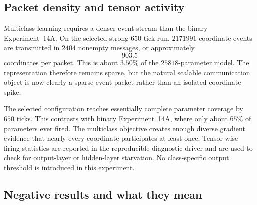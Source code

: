 \subsection{Packet density and tensor activity}

Multiclass learning requires a denser event stream than the binary Experiment~14A. On the selected strong $650$-tick run, $2171991$ coordinate events are transmitted in $2404$ nonempty messages, or approximately
\begin{equation}
903.5
\end{equation}
coordinates per packet. This is about $3.50\%$ of the $25818$-parameter model. The representation therefore remains sparse, but the natural scalable communication object is now clearly a sparse event packet rather than an isolated coordinate spike.

The selected configuration reaches essentially complete parameter coverage by $650$ ticks. This contrasts with binary Experiment~14A, where only about $65\%$ of parameters ever fired. The multiclass objective creates enough diverse gradient evidence that nearly every coordinate participates at least once. Tensor-wise firing statistics are reported in the reproducible diagnostic driver and are used to check for output-layer or hidden-layer starvation. No class-specific output threshold is introduced in this experiment.

\subsection{Negative results and what they mean}

